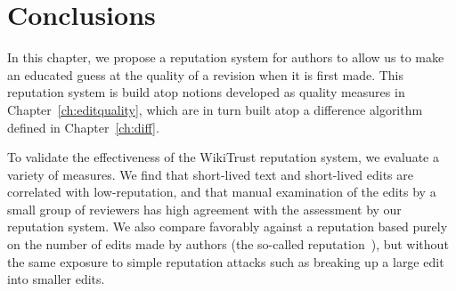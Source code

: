 \section{Conclusions}

In this chapter, we propose a reputation system for authors to allow us
to make an educated guess at the quality of a revision when it is first
made.
This reputation system is build atop notions developed as quality
measures in Chapter~\ref{ch:editquality}, which are in turn built atop a
difference algorithm defined in Chapter~\ref{ch:diff}.

To validate the effectiveness of the WikiTrust reputation system, we
evaluate a variety of measures.
We find that short-lived text and short-lived edits are correlated with low-reputation,
and that manual examination of the edits by a small group of reviewers
has high agreement with the assessment by our reputation system.
We also compare favorably against a reputation based purely on the
number of edits made by authors (the so-called 
reputation~\cite{Cross2006}), but without the same exposure to simple
reputation attacks such as breaking up a large edit into smaller edits.

